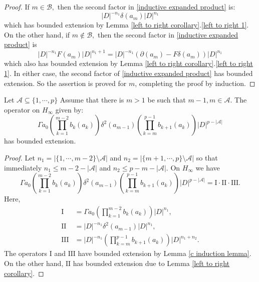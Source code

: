 \begin{proof}
        If $m\in\mathscr{B},$ then the second factor in \eqref{inductive expanded product} is:
        \begin{equation*}
            |D|^{-n_1}\delta(a_m)|D|^{n_1}
        \end{equation*}
        which has bounded extension by Lemma \ref{left to right corollary}.\eqref{left to right 1}. On the other hand, if $m\notin\mathscr{B},$ then the second factor in \eqref{inductive expanded product} is
        \begin{equation*}
            |D|^{-n_1}F(a_m)|D|^{n_1+1} = |D|^{-n_1}(\partial(a_m)-F\delta(a_m))|D|^{n_1}
        \end{equation*}
        which also has bounded extension by Lemma \ref{left to right corollary}.\eqref{left to right 1}. In either case, the second factor of \eqref{inductive expanded product} has bounded extension. So the assertion is proved
        for $m$, completing the proof by induction.
    \end{proof}


    \begin{lem}\label{c first alert lemma} 
        Let $\mathscr{A}\subseteq\{1,\cdots,p\}$ Assume that there is $m > 1$ be such that $m-1,m\in\mathscr{A}.$ 
        The operator on $H_\infty$ given by:
        \begin{equation*}
            \Gamma a_0\left(\prod_{k=1}^{m-2}b_k(a_k)\right)\delta^2(a_{m-1})\left(\prod_{k=m}^{p-1}b_{k+1}(a_k)\right)|D|^{p-|\mathscr{A}|}
        \end{equation*}
        has bounded extension.
    \end{lem}
    \begin{proof} 
        Let $n_1=|\{1,\cdots,m-2\}\setminus\mathscr{A}|$ and $n_2=|\{m+1,\cdots,p\}\setminus\mathscr{A}|$ so that immediately $n_1 \leq m-2-|\mathscr{A}|$ and $n_2 \leq p-m-|\mathscr{A}|$. On $H_\infty$ we have
        $$\Gamma a_0\left(\prod_{k=1}^{m-2}b_k(a_k)\right)\delta^2(a_{m-1})\left(\prod_{k=m}^{p-1}b_{k+1}(a_k)\right)|D|^{p-|\mathscr{A}|}= \mathrm{I}\cdot \mathrm{II}\cdot \mathrm{III}.$$
        Here,
        \begin{align*}
            \mathrm{I}   &= \Gamma a_0\left(\prod_{k=1}^{m-2}b_k(a_k)\right)|D|^{n_1},\\
            \mathrm{II}  &= |D|^{-n_1}\delta^2(a_{m-1})|D|^{n_1},\\
            \mathrm{III} &= |D|^{-n_1}\left(\prod_{k=m}^{p-1}b_{k+1}(a_k)\right)|D|^{n_1+n_2}.
        \end{align*}
        The operators $\mathrm{I}$ and $\mathrm{III}$ have bounded extension by Lemma \ref{c induction lemma}. On the other hand, $\mathrm{II}$ has bounded extension due to Lemma \ref{left to right corollary}.
    \end{proof}

